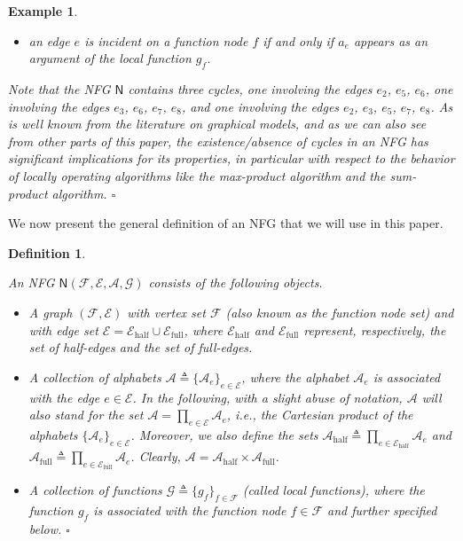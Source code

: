 \documentclass[journal, twocolumn]{IEEEtran}
\newcommand{\ie}{\emph{i.e.}}
\newcommand{\set}[1]{\mathcal{#1}}
\newcommand{\graph}[1]{\mathsf{#1}}
\newcommand{\defeq}{\triangleq}
\newcommand{\setA}{\set{A}}
\newcommand{\setAfull}{\set{A}_{\mathrm{full}}}
\newcommand{\setAhalf}{\set{A}_{\mathrm{half}}}
\newcommand{\setE}{\set{E}}
\newcommand{\setEfull}{\set{E}_{\mathrm{full}}}
\newcommand{\setEhalf}{\set{E}_{\mathrm{half}}}
\newcommand{\setF}{\set{F}}
\newcommand{\setG}{\set{G}}
\newcommand{\graphN}{\graph{N}}
\newcommand{\?}{\mathrm{?}}
\newcommand{\qedwhite}{\hspace*{\fill}%
  $\square$\smallskip}
\newcommand{\defend}{\qedwhite}
\newcommand{\exampleend}{\qedwhite}
\newtheorem{Definition}[Lemma]{Definition}
\newtheorem{Example}[Lemma]{Example}
\begin{document}
\begin{Example}
\begin{itemize}
  \item an edge $e$ is incident on a function node $f$ if and only if $a_e$
    appears as an argument of the local function $g_f$.

  \end{itemize}
  Note that the NFG $\graphN$ contains three cycles, one involving the edges
  $e_2$, $e_5$, $e_6$, one involving the edges $e_3$, $e_6$, $e_7$, $e_8$, and
  one involving the edges $e_2$, $e_3$, $e_5$, $e_7$, $e_8$. As is well known
  from the literature on graphical models, and as we can also see from other
  parts of this paper, the existence/absence of cycles in an NFG has
  significant implications for its properties, in particular with respect to
  the behavior of locally operating algorithms like the max-product algorithm
  and the sum-product algorithm.  \exampleend
\end{Example}


We now present the general definition of an NFG that we will use in this
paper.


\begin{Definition}
  \label{def:normal:factor:graph:1}

  An NFG $\graphN(\setF, \setE, \setA, \setG)$ consists of the following
  objects.
  \begin{itemize}
   
  \item A graph $(\setF, \setE)$ with vertex set $\setF$ (also known as the
    function node set) and with edge set $\setE = \setEhalf \cup \setEfull$,
    where $\setEhalf$ and $\setEfull$ represent, respectively, the set of
    half-edges and the set of full-edges.

  \item A collection of alphabets $\setA \defeq \{ \setA_e \}_{e \in \setE}$,
    where the alphabet $\setA_e$ is associated with the edge $e \in \setE$. In
    the following, with a slight abuse of notation, $\setA$ will also stand
    for the set $\setA = \prod_{e \in \setE} \setA_e$, \ie, the Cartesian
    product of the alphabets $\{ \setA_e \}_{e \in \setE}$. Moreover, we also
    define the sets $\setAhalf \defeq \prod_{e \in \setEhalf} \setA_e$ and
    $\setAfull \defeq \prod_{e \in \setEfull} \setA_e$. Clearly, $\setA =
    \setAhalf \times \setAfull$.
  
  \item A collection of functions $\setG \defeq \{ g_f \}_{f \in \setF}$
    (called local functions), where the function $g_f$ is associated with the
    function node $f \in \setF$ and further specified below. \defend

  \end{itemize}
\end{Definition}
\end{document}

